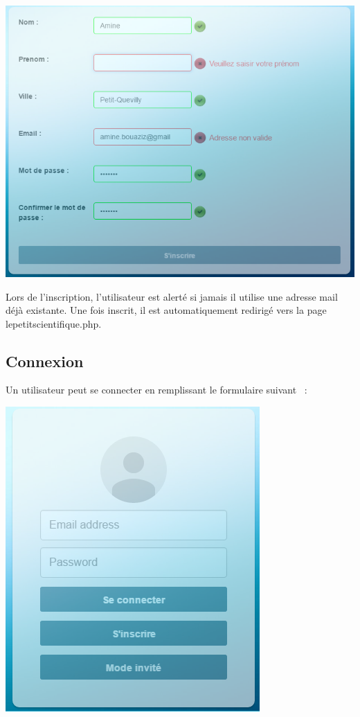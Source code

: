 \documentclass[hidelinks, 12pt,a4paper]{article}
\begin{document}
\begin{center}
\includegraphics[scale=0.8]{images/inscriptionnnvalid.png}\\
\end{center}

Lors de l'inscription, l'utilisateur est alerté si jamais il utilise une adresse mail déjà existante. Une fois inscrit, il est automatiquement redirigé vers la page lepetitscientifique.php.

\newpage
\subsection{Connexion}
Un utilisateur peut se connecter en remplissant le formulaire suivant ~:\\

\begin{center}
\includegraphics[scale=0.8]{images/connexion.png}\\
\end{center}
\end{document}
